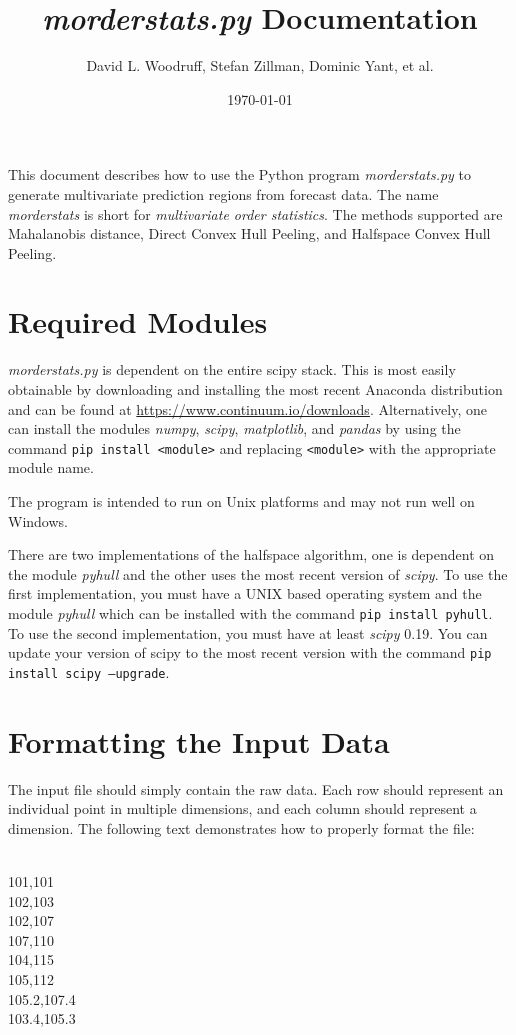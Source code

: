 \documentclass[11pt]{article}
\title{\textit{morderstats.py} Documentation}
\author{David L. Woodruff, Stefan Zillman, Dominic Yant, et al.}
\date{\today}
\begin{document}
\maketitle

This document describes how to use the Python program
\textit{morderstats.py} to generate multivariate prediction regions
from forecast data. The name \textit{morderstats} is short for
\textit{multivariate order statistics}. The methods supported are
Mahalanobis distance, Direct Convex Hull Peeling, and Halfspace Convex
Hull Peeling.

\section{Required Modules}

\textit{morderstats.py} is dependent on the entire scipy stack. This is most easily obtainable by downloading and installing the most recent Anaconda distribution and can be found at  \url{https://www.continuum.io/downloads}. Alternatively, one can install the modules \textit{numpy}, \textit{scipy}, \textit{matplotlib}, and \textit{pandas} by using the command \texttt{pip install <module>} and replacing \texttt{<module>} with the appropriate module name. 

The program is intended to run on Unix platforms and may not run well on Windows.

There are two implementations of the halfspace algorithm, one is dependent on the module \textit{pyhull} and the other uses the most recent version of \textit{scipy}. To use the first implementation, you must have a UNIX based operating system and the module \textit{pyhull} which can be installed with the command \texttt{pip install pyhull}. To use the second implementation, you must have at least \textit{scipy} 0.19. You can update your version of scipy to the most recent version with the command \texttt{pip install scipy --upgrade}.

\section{Formatting the Input Data}

The input file should simply contain the raw data. Each row should represent an individual point in multiple dimensions, and each column should represent a dimension. The following text demonstrates how to properly format the file:

\begin{framed}
	\noindent
\\
101,101\\
102,103\\
102,107\\
107,110\\
104,115\\
105,112\\
105.2,107.4\\
103.4,105.3\\
\end{framed}
\end{document}
